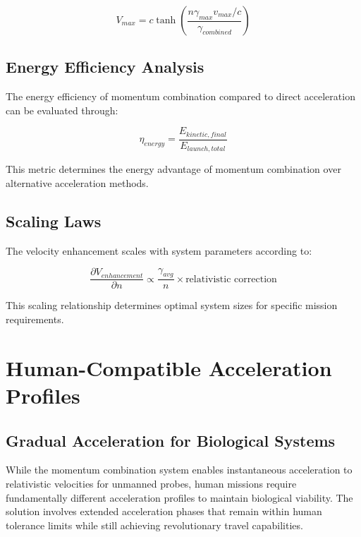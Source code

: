 \documentclass[11pt,a4paper]{article}
\theoremstyle{remark}
\begin{document}
\begin{equation}
V_{max} = c \tanh\left(\frac{n \gamma_{max} v_{max}/c}{\gamma_{combined}}\right)
\label{eq:velocity_upper_bound}
\end{equation}

\subsection{Energy Efficiency Analysis}

The energy efficiency of momentum combination compared to direct acceleration can be evaluated through:

\begin{equation}
\eta_{energy} = \frac{E_{kinetic,final}}{E_{launch,total}}
\label{eq:energy_efficiency}
\end{equation}

This metric determines the energy advantage of momentum combination over alternative acceleration methods.

\subsection{Scaling Laws}

The velocity enhancement scales with system parameters according to:

\begin{equation}
\frac{\partial V_{enhancement}}{\partial n} \propto \frac{\gamma_{avg}}{n} \times \text{relativistic correction}
\label{eq:scaling_law}
\end{equation}

This scaling relationship determines optimal system sizes for specific mission requirements.

\section{Human-Compatible Acceleration Profiles}

\subsection{Gradual Acceleration for Biological Systems}

While the momentum combination system enables instantaneous acceleration to relativistic velocities for unmanned probes, human missions require fundamentally different acceleration profiles to maintain biological viability. The solution involves extended acceleration phases that remain within human tolerance limits while still achieving revolutionary travel capabilities.
\end{document}
